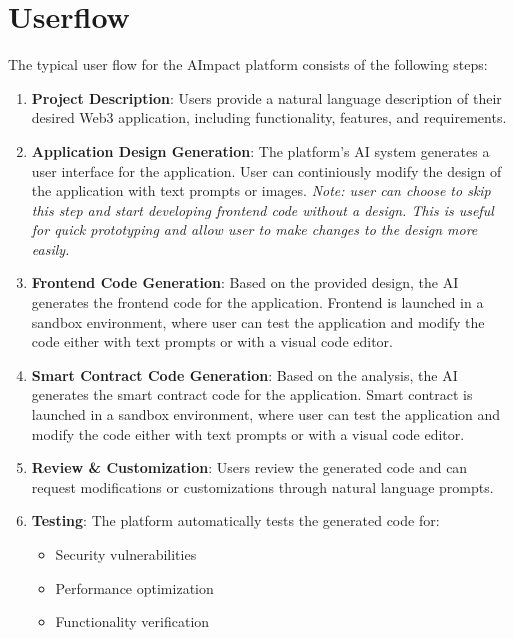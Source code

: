 \documentclass[12pt,a4paper]{article}
\begin{document}
\section{Userflow}
\label{sec:userflow}

The typical user flow for the AImpact platform consists of the following steps:

\begin{enumerate}
    \item \textbf{Project Description}: Users provide a natural language description of their desired Web3 application, including functionality, features, and requirements.
    
    \item \textbf{Application Design Generation}: The platform's AI system generates a user interface for the application. 
    User can continiously modify the design of the application with text prompts or images.
    \textit{Note: user can choose to skip this step and start developing frontend code without a design. 
    This is useful for quick prototyping and allow user to make changes to the design more easily.}
   
    \item \textbf{Frontend Code Generation}: 
    Based on the provided design, the AI generates the frontend code for the application. 
    Frontend is launched in a sandbox environment, where user can test the application and modify the code either with text prompts or with a visual code editor.
    
    \item \textbf{Smart Contract Code Generation}: 
    Based on the analysis, the AI generates the smart contract code for the application. 
    Smart contract is launched in a sandbox environment, where user can test the application and modify the code either with text prompts or with a visual code editor.
    
    

    \item \textbf{Review \& Customization}: Users review the generated code and can request modifications or customizations through natural language prompts.
    
    \item \textbf{Testing}: The platform automatically tests the generated code for:
    \begin{itemize}
        \item Security vulnerabilities
        \item Performance optimization
        \item Functionality verification
    \end{itemize}
    

\end{enumerate}
\end{document}
